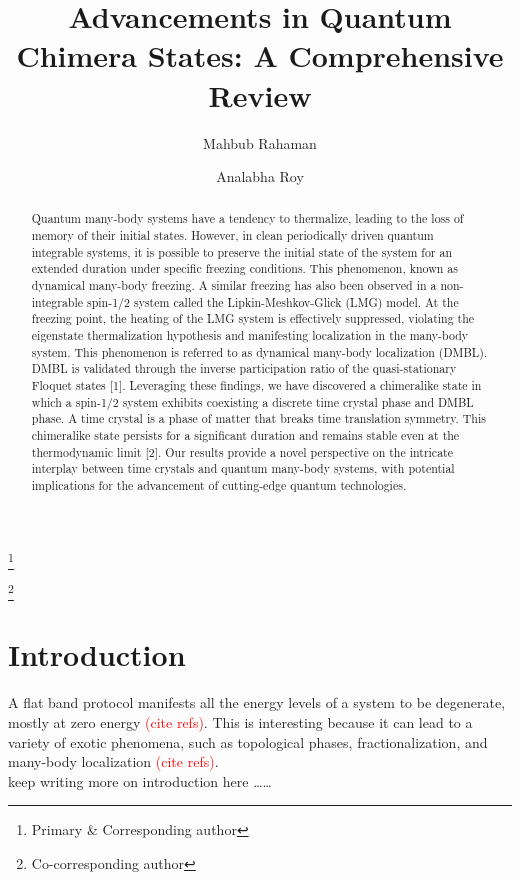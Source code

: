 \documentclass[%
reprint,
superscriptaddress,
amsmath,amssymb,
aps,
prb,
showkeys,
]{revtex4-2}
\newcommand{\red}[1]{\textcolor{red}{#1}}
\begin{document}

\title{Advancements in Quantum Chimera States: A Comprehensive Review}%

\author{Mahbub Rahaman}
\thanks{Primary \& Corresponding author}
\author{Analabha Roy}
\thanks{Co-corresponding author}


\begin{abstract}
	Quantum many-body systems have a tendency to thermalize, leading to the loss of memory of their initial states. However, in clean periodically driven quantum integrable systems, it is possible to preserve the initial state of the system for an extended duration under specific freezing conditions. This phenomenon, known as dynamical many-body freezing. A similar freezing has also been observed in a non-integrable spin-1/2 system called the Lipkin-Meshkov-Glick (LMG) model. At the freezing point, the heating of the LMG system is effectively suppressed, violating the eigenstate thermalization hypothesis and manifesting localization in the many-body system. This phenomenon is referred to as dynamical many-body localization (DMBL). DMBL is validated through the inverse participation ratio of the quasi-stationary Floquet states [1]. Leveraging these findings, we have discovered a chimeralike state in which a spin-1/2 system exhibits coexisting a discrete time crystal phase and DMBL phase. A time crystal is a phase of matter that breaks time translation symmetry. This chimeralike state persists for a significant duration and remains stable even at the thermodynamic limit [2]. Our results provide a novel perspective on the intricate interplay between time crystals and quantum many-body systems, with potential implications for the advancement of cutting-edge quantum technologies.
\end{abstract}

\maketitle

\section{Introduction}
A flat band protocol manifests all the energy levels of a system to be degenerate, mostly at zero energy \red{(cite refs)}. This is interesting because it can lead to a variety of exotic phenomena, such as topological phases, fractionalization, and many-body localization  \red{(cite refs)}.\\ 
\vskip 1cm
	keep writing more on introduction here \dots\dots
\end{document}
